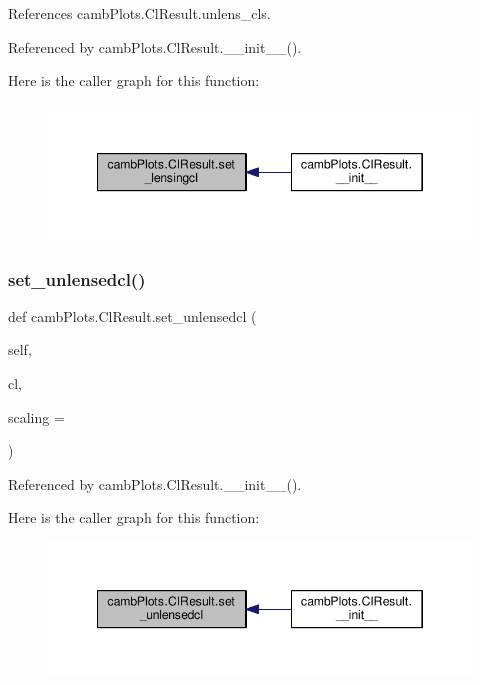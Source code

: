 References camb\+Plots.\+Cl\+Result.\+unlens\+\_\+cls.



Referenced by camb\+Plots.\+Cl\+Result.\+\_\+\+\_\+init\+\_\+\+\_\+().

Here is the caller graph for this function\+:
\nopagebreak
\begin{figure}[H]
\begin{center}
\leavevmode
\includegraphics[width=346pt]{classcambPlots_1_1ClResult_a8d99b24daec518d36af637dbe89cfa22_icgraph}
\end{center}
\end{figure}
\mbox{\label{classcambPlots_1_1ClResult_a877f90feb35255e3d3b3a34d2f035309}} 
\subsubsection{\texorpdfstring{set\+\_\+unlensedcl()}{set\_unlensedcl()}}
{\footnotesize\ttfamily def camb\+Plots.\+Cl\+Result.\+set\+\_\+unlensedcl (\begin{DoxyParamCaption}\item[{}]{self,  }\item[{}]{cl,  }\item[{}]{scaling = {} }\end{DoxyParamCaption})}



Referenced by camb\+Plots.\+Cl\+Result.\+\_\+\+\_\+init\+\_\+\+\_\+().

Here is the caller graph for this function\+:
\nopagebreak
\begin{figure}[H]
\begin{center}
\leavevmode
\includegraphics[width=346pt]{classcambPlots_1_1ClResult_a877f90feb35255e3d3b3a34d2f035309_icgraph}
\end{center}
\end{figure}


